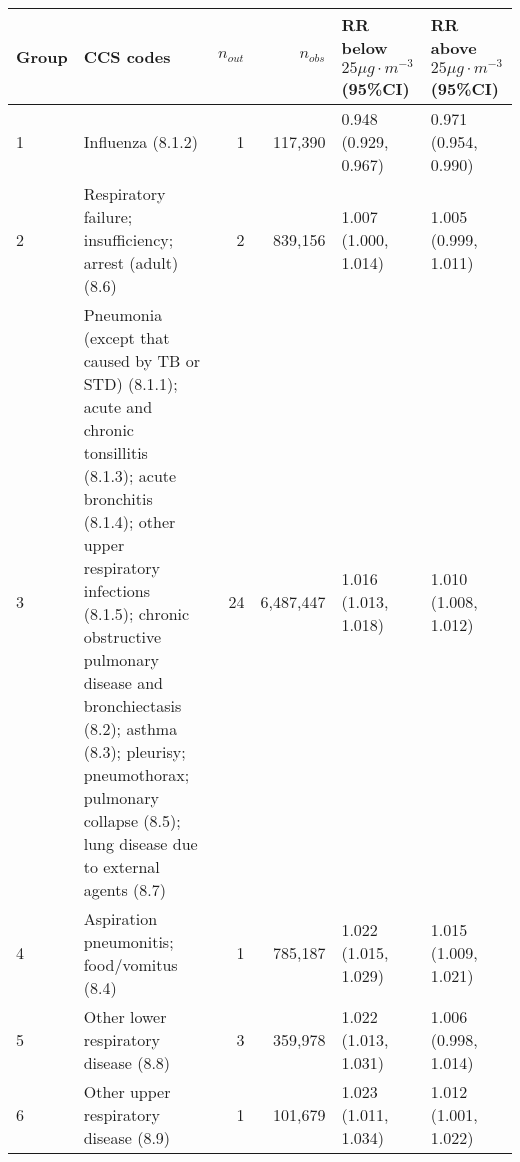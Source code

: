\begin{tabular}{lp{6.5cm}rrp{2.2cm}p{2.2cm}}
  \hline
Group & CCS codes & $n_{out}$ & $n_{obs}$ & RR below $25 \mu g \cdot m^{-3}$ (95\%CI) & RR above $25 \mu g \cdot m^{-3}$ (95\%CI) \\ 
  \hline
   1 & Influenza (8.1.2) &    1 & 117,390 & 0.948 (0.929, 0.967) & 0.971 (0.954, 0.990) \\ 
     2 & Respiratory failure; insufficiency; arrest (adult) (8.6) &    2 & 839,156 & 1.007 (1.000, 1.014) & 1.005 (0.999, 1.011) \\ 
     3 & Pneumonia (except that caused by TB or STD) (8.1.1); acute and chronic tonsillitis (8.1.3); acute bronchitis (8.1.4); other upper respiratory infections (8.1.5); chronic obstructive pulmonary disease and bronchiectasis (8.2); asthma (8.3); pleurisy; pneumothorax; pulmonary collapse (8.5); lung disease due to external agents (8.7) &   24 & 6,487,447 & 1.016 (1.013, 1.018) & 1.010 (1.008, 1.012) \\ 
     4 & Aspiration pneumonitis; food/vomitus (8.4) &    1 & 785,187 & 1.022 (1.015, 1.029) & 1.015 (1.009, 1.021) \\ 
     5 & Other lower respiratory disease (8.8) &    3 & 359,978 & 1.022 (1.013, 1.031) & 1.006 (0.998, 1.014) \\ 
     6 & Other upper respiratory disease (8.9) &    1 & 101,679 & 1.023 (1.011, 1.034) & 1.012 (1.001, 1.022) \\ 
   \hline
\end{tabular}

